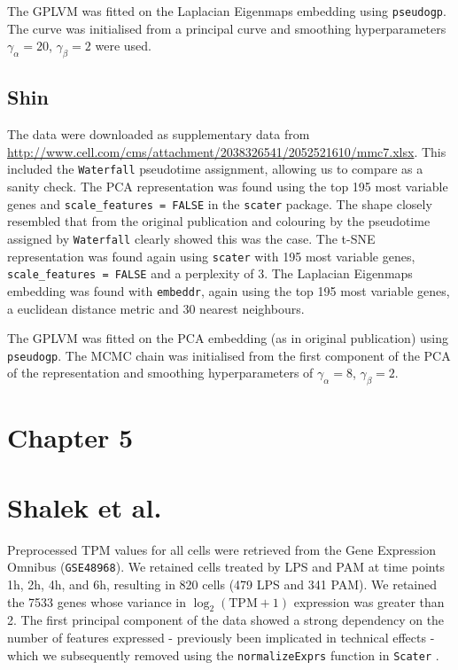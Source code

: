 The GPLVM was fitted on the Laplacian Eigenmaps embedding using \texttt{pseudogp}. The curve was initialised from a principal curve and smoothing hyperparameters $\gamma_\alpha = 20$, $\gamma_\beta = 2$ were used.

\subsection{Shin}
The data were downloaded as supplementary data from \url{http://www.cell.com/cms/attachment/2038326541/2052521610/mmc7.xlsx}. This included the \texttt{Waterfall} pseudotime assignment, allowing us to compare as a sanity check. The PCA representation was found using the top 195 most variable genes and \texttt{scale\_features = FALSE} in the \texttt{scater} package. The shape closely resembled that from the original publication and colouring by the pseudotime assigned by \texttt{Waterfall} clearly showed this was the case. The t-SNE representation was found again using \texttt{scater} with 195 most variable genes, \texttt{scale\_features = FALSE} and a perplexity of 3. The Laplacian Eigenmaps embedding was found with \texttt{embeddr}, again using the top 195 most variable genes, a euclidean distance metric and 30 nearest neighbours.

The GPLVM was fitted on the PCA embedding (as in original publication) using \texttt{pseudogp}. The MCMC chain was initialised from the first component of the PCA of the representation and smoothing hyperparameters of $\gamma_\alpha = 8$, $\gamma_\beta = 2$.

\section{Chapter 5}

\section{Shalek et al.} \label{sec:prepshalek}

Preprocessed TPM values for all cells were retrieved from the Gene Expression Omnibus (\texttt{GSE48968}). We retained cells treated by LPS and PAM at time points 1h, 2h, 4h, and 6h, resulting in 820 cells (479 LPS and 341 PAM). We retained the 7533 genes whose variance in $\log_2(\text{TPM} + 1)$ expression was greater than 2. The first principal component of the data showed a strong dependency on the number of features expressed - previously been implicated in technical effects \cite{Hicks2015-sw}  - which we subsequently removed using the \texttt{normalizeExprs} function in \texttt{Scater} \cite{McCarthy2017-we}.

